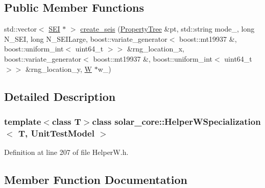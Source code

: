 \subsection*{Public Member Functions}
\begin{DoxyCompactItemize}
\item 
std\+::vector$<$ \hyperlink{classsolar__core_1_1_s_e_i}{S\+E\+I} $\ast$ $>$ \hyperlink{classsolar__core_1_1_helper_w_specialization_3_01_t_00_01_unit_test_model_01_4_adf23c2c9808e7d9ef18a4d778bacccce}{create\+\_\+seis} (\hyperlink{namespacesolar__core_adeda2737d6938c190eb774a5b2495045}{Property\+Tree} \&pt, std\+::string mode\+\_\+, long N\+\_\+\+S\+E\+I, long N\+\_\+\+S\+E\+I\+Large, boost\+::variate\+\_\+generator$<$ boost\+::mt19937 \&, boost\+::uniform\+\_\+int$<$ uint64\+\_\+t $>$$>$ \&rng\+\_\+location\+\_\+x, boost\+::variate\+\_\+generator$<$ boost\+::mt19937 \&, boost\+::uniform\+\_\+int$<$ uint64\+\_\+t $>$$>$ \&rng\+\_\+location\+\_\+y, \hyperlink{classsolar__core_1_1_w}{W} $\ast$w\+\_\+)
\end{DoxyCompactItemize}


\subsection{Detailed Description}
\subsubsection*{template$<$class T$>$class solar\+\_\+core\+::\+Helper\+W\+Specialization$<$ T, Unit\+Test\+Model $>$}



Definition at line 207 of file Helper\+W.\+h.



\subsection{Member Function Documentation}
\hypertarget{classsolar__core_1_1_helper_w_specialization_3_01_t_00_01_unit_test_model_01_4_adf23c2c9808e7d9ef18a4d778bacccce}{}
